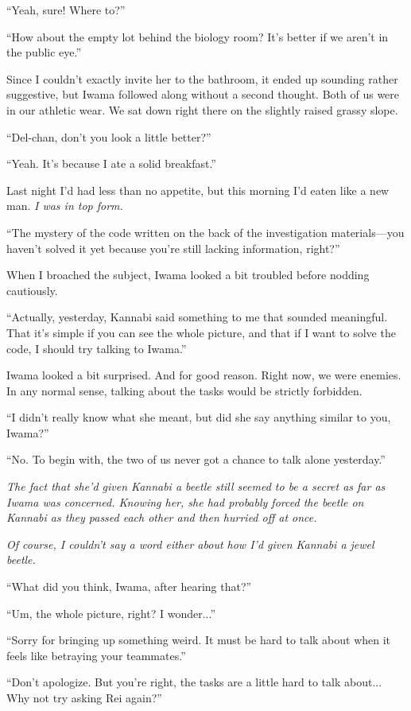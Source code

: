 \documentclass[
    a4paper,
    12pt,
    twoside,
    openany,
    UTF8,
    fontset=windows
]{ctexbook}
\begin{document}
``Yeah, sure! Where to?''

``How about the empty lot behind the biology room? It's better if we aren't in the public eye.''

Since I couldn't exactly invite her to the bathroom, it ended up sounding rather suggestive, but Iwama followed along without a second thought. Both of us were in our athletic wear. We sat down right there on the slightly raised grassy slope.

``Del-chan, don't you look a little better?''

``Yeah. It's because I ate a solid breakfast.''

Last night I'd had less than no appetite, but this morning I'd eaten like a new man. \textit{I was in top form.}

``The mystery of the code written on the back of the investigation materials---you haven't solved it yet because you're still lacking information, right?''

When I broached the subject, Iwama looked a bit troubled before nodding cautiously.

``Actually, yesterday, Kannabi said something to me that sounded meaningful. That it's simple if you can see the whole picture, and that if I want to solve the code, I should try talking to Iwama.''

Iwama looked a bit surprised. And for good reason. Right now, we were enemies. In any normal sense, talking about the tasks would be strictly forbidden.

``I didn't really know what she meant, but did she say anything similar to you, Iwama?''

``No. To begin with, the two of us never got a chance to talk alone yesterday.''

\textit{The fact that she'd given Kannabi a beetle still seemed to be a secret as far as Iwama was concerned. Knowing her, she had probably forced the beetle on Kannabi as they passed each other and then hurried off at once.}

\textit{Of course, I couldn't say a word either about how I'd given Kannabi a jewel beetle.}

``What did you think, Iwama, after hearing that?''

``Um, the whole picture, right? I wonder...''

``Sorry for bringing up something weird. It must be hard to talk about when it feels like betraying your teammates.''

``Don't apologize. But you're right, the tasks are a little hard to talk about... Why not try asking Rei again?''
\end{document}
